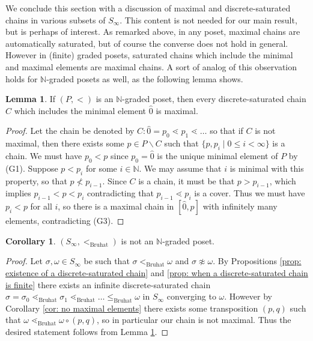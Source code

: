 \documentclass[oneside,11pt,reqno]{amsart}
\newcommand{\nn}{\ensuremath{\mathbb{N}}}
\theoremstyle{definition}
\newtheorem{proof techniques}{Proof Techniques}
\newtheorem{lemma}{Lemma}
\newtheorem{corollary}{Corollary}
\begin{document}
We conclude this section with a discussion of maximal and discrete-saturated chains in various subsets of $S_\infty$. This content is not needed for our main result, but is perhaps of interest. As remarked above, in any poset, maximal chains are automatically saturated, but of course the converse does not hold in general. However in (finite) graded posets, saturated chains which include the minimal and maximal elements are maximal chains. A sort of analog of this observation holds for $\nn$-graded posets as well, as the following lemma shows. 

\begin{lemma}\label{lem: discrete-saturated chains are maximal in graded posets}
    If $(P, <)$ is an $\nn$-graded poset, then every discrete-saturated chain $C$ which includes the minimal element $\hat{0}$ is maximal.
\end{lemma}

\begin{proof}
    Let the chain be denoted by $C: \hat{0} = p_0 \lessdot p_1 \lessdot \ldots$ so that if $C$ is not maximal, then there exists some $p \in P \smallsetminus C$ such that $\{ p, p_i \mid 0 \leq i < \infty \}$ is a chain. We must have $p_0 < p$ since $p_0 = \hat{0}$ is the unique minimal element of $P$ by (G1). Suppose $p < p_i$ for some $i \in \nn$. We may assume that $i$ is minimal with this property, so that $p \not< p_{i - 1}$. Since $C$ is a chain, it must be that $p > p_{i - 1}$, which implies $p_{i - 1} < p < p_i$ contradicting that $p_{i - 1} \lessdot p_i$ is a cover. Thus we must have $p_i < p$ for all $i$, so there is a maximal chain in $[\hat{0} , p]$ with infinitely many elements, contradicting (G3).
\end{proof}

\begin{corollary}
$(S_\infty, <_\text{Bruhat})$ is not an $\nn$-graded poset.
\end{corollary}

\begin{proof}
Let $\sigma , \omega \in S_\infty$ be such that $\sigma <_\text{Bruhat} \omega$ and $\sigma \not\approx \omega$. By Propositions \ref{prop: existence of a discrete-saturated chain} and \ref{prop: when a discrete-saturated chain is finite} there exists an infinite discrete-saturated chain $\sigma = \sigma_0 \lessdot_\text{Bruhat} \sigma_1 \lessdot_\text{Bruhat} \ldots \leq_\text{Bruhat} \omega$ in $S_\infty$ converging to $\omega$. However by Corollary \ref{cor: no maximal elements} there exists some transposition $(p , q)$ such that $\omega \lessdot_\text{Bruhat} \omega \circ (p , q)$, so in particular our chain is not maximal. Thus the desired statement follows from Lemma \ref{lem: discrete-saturated chains are maximal in graded posets}. 
\end{proof} 
\end{document}
